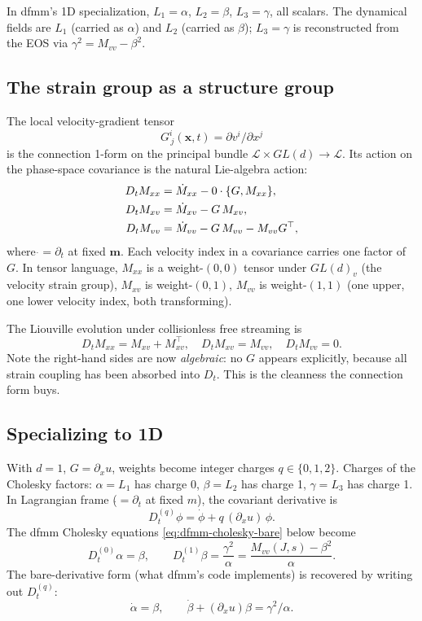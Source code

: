 \documentclass[11pt]{article}
\begin{document}
In dfmm's 1D specialization, $L_1 = \alpha$, $L_2 = \beta$, $L_3 = \gamma$,
all scalars. The dynamical fields are $L_1$ (carried as $\alpha$) and
$L_2$ (carried as $\beta$); $L_3 = \gamma$ is reconstructed from the EOS
via $\gamma^2 = M_{vv} - \beta^2$.

\subsection{The strain group as a structure group}
The local velocity-gradient tensor
\[
  G^i_{\,j}(\bm{x}, t) = \partial v^i/\partial x^j
\]
is the connection 1-form on the principal bundle $\mathcal{L}\times
GL(d) \to \mathcal{L}$. Its action on the phase-space covariance is the
natural Lie-algebra action:
\begin{align}
  D_t M_{xx} &= \dot M_{xx} - 0\cdot \{G, M_{xx}\}, \notag\\
  D_t M_{xv} &= \dot M_{xv} - G\,M_{xv}, \notag\\
  D_t M_{vv} &= \dot M_{vv} - G\,M_{vv} - M_{vv} G^\top,
  \label{eq:Liouville-cov}
\end{align}
where $\dot{} = \partial_t$ at fixed $\bm{m}$. Each velocity index in a
covariance carries one factor of $G$. In tensor language, $M_{xx}$ is a
weight-$(0,0)$ tensor under $GL(d)_v$ (the velocity strain group),
$M_{xv}$ is weight-$(0,1)$, $M_{vv}$ is weight-$(1,1)$ (one upper, one
lower velocity index, both transforming).

The Liouville evolution under collisionless free streaming is
\begin{equation}
  D_t M_{xx} = M_{xv} + M_{xv}^\top,\quad
  D_t M_{xv} = M_{vv},\quad
  D_t M_{vv} = 0.
\end{equation}
Note the right-hand sides are now \emph{algebraic}: no $G$ appears
explicitly, because all strain coupling has been absorbed into $D_t$.
This is the cleanness the connection form buys.

\subsection{Specializing to 1D}
With $d=1$, $G = \partial_x u$, weights become integer charges
$q\in\{0,1,2\}$. Charges of the Cholesky factors:
$\alpha=L_1$ has charge 0, $\beta=L_2$ has charge 1, $\gamma=L_3$ has
charge 1.
In Lagrangian frame ($\dot{} = \partial_t$ at fixed $m$), the covariant
derivative is
\begin{equation}
  D_t^{(q)}\phi = \dot\phi + q\,(\partial_x u)\,\phi.
  \label{eq:Dtq-1D}
\end{equation}
The dfmm Cholesky equations \eqref{eq:dfmm-cholesky-bare} below become
\begin{equation}
  \boxed{\ D_t^{(0)}\alpha = \beta,\qquad
  D_t^{(1)}\beta = \frac{\gamma^2}{\alpha} = \frac{M_{vv}(J,s) - \beta^2}{\alpha}.\ }
  \label{eq:dfmm-cholesky-cov}
\end{equation}
The bare-derivative form (what dfmm's code implements) is recovered by
writing out $D_t^{(q)}$:
\begin{equation}
  \dot\alpha = \beta,\qquad
  \dot\beta + (\partial_x u)\beta = \gamma^2/\alpha.
  \label{eq:dfmm-cholesky-bare}
\end{equation}
\end{document}
